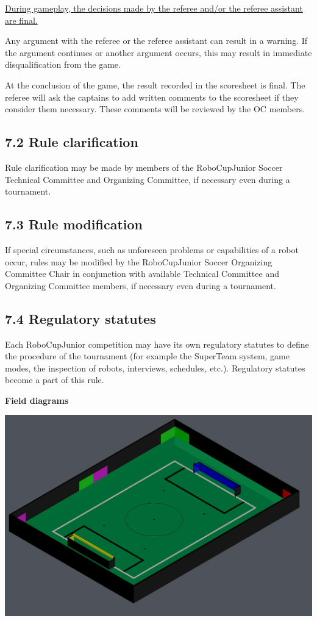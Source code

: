 \documentclass{article}
\begin{document}
 \underline{During gameplay, the decisions made by the referee and/or the referee assistant are final.} 

Any argument with the referee or the referee assistant can result in a warning. If the argument continues or another argument occurs, this may result in immediate disqualification from the game.

At the conclusion of the game, the \textcolor{color-5}{result recorded in the scoresheet is final. The referee will ask the captains to add written comments to the scoresheet if they consider them necessary. These comments will be reviewed by the OC members.} 

\subsection{7.2 Rule clarification \label{ref-049}}

Rule clarification may be made by members of the RoboCupJunior Soccer Technical Committee and Organizing Committee, if necessary even during a tournament. 

\subsection{7.3 Rule modification \label{ref-050}}

If special circumstances, such as unforeseen problems or capabilities of a robot occur, rules may be modified by the RoboCupJunior Soccer Organizing Committee Chair in conjunction with available Technical Committee and Organizing Committee members, if necessary even during a tournament.

\subsection{7.4 Regulatory statutes \label{ref-051}}

Each RoboCupJunior competition may have its own regulatory statutes to define the procedure of the tournament (for example the SuperTeam system, game modes, the inspection of robots, interviews, schedules, etc.). Regulatory statutes become a part of this rule.

\textbf{Field diagrams}

\includegraphics[width=1\textwidth]{media/image5.jpeg}
\end{document}
